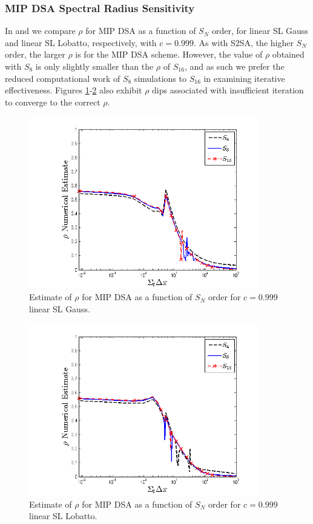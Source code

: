 \newpage

\subsubsection{MIP DSA Spectral Radius Sensitivity}


In  and  we compare $\rho$ for MIP DSA as a function of $S_N$ order, for linear SL Gauss and linear SL  Lobatto, respectively, with $c=0.999$.
As with S2SA, the higher $S_N$ order, the larger $\rho$ is for the MIP DSA scheme. 
However, the value of $\rho$ obtained with $S_8$ is only slightly smaller than the $\rho$ of $S_{16}$, and as such we prefer the reduced computational work of $S_8$ simulations to $S_{16}$ in examining iterative effectiveness.  
Figures \ref{fig:mip_gauss_as_fun_sn}-\ref{fig:mip_lobatto_as_fun_sn} also exhibit $\rho$ dips associated with insufficient iteration to converge to the correct $\rho$. 
 
\vfill{}

\begin{figure}[!htp]
\centering
\includegraphics[width=10cm]{chapter4_acceleration/Const_2_Constant_XS_sn_comparions_MIP_Gauss.png}
\caption{Estimate of $\rho$ for MIP DSA as a function of  $S_N$ order for $c=0.999$ linear SL Gauss.}
\label{fig:mip_gauss_as_fun_sn}
\end{figure}

\begin{figure}[!hbp]
\centering
\includegraphics[width=10cm]{chapter4_acceleration/Const_2_Constant_XS_sn_comparions_MIP_Lobatto.png}
\caption{Estimate of $\rho$ for MIP DSA as a function of  $S_N$ order for $c=0.999$ linear SL Lobatto.}
\label{fig:mip_lobatto_as_fun_sn}
\end{figure}


